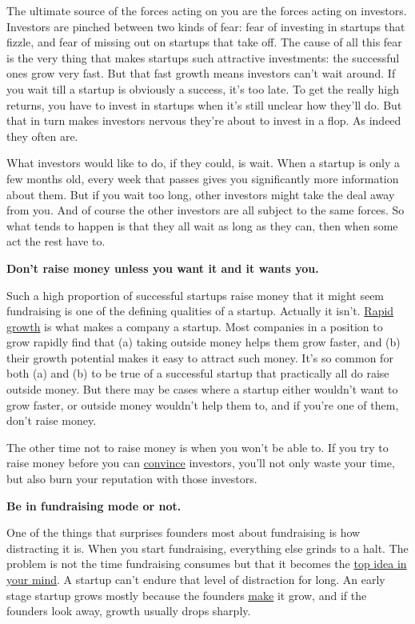 The ultimate source of the forces acting on you are the forces acting on
investors. Investors are pinched between two kinds of fear: fear of
investing in startups that fizzle, and fear of missing out on startups
that take off. The cause of all this fear is the very thing that makes
startups such attractive investments: the successful ones grow very
fast. But that fast growth means investors can't wait around. If you
wait till a startup is obviously a success, it's too late. To get the
really high returns, you have to invest in startups when it's still
unclear how they'll do. But that in turn makes investors nervous they're
about to invest in a flop. As indeed they often are.

What investors would like to do, if they could, is wait. When a startup
is only a few months old, every week that passes gives you significantly
more information about them. But if you wait too long, other investors
might take the deal away from you. And of course the other investors are
all subject to the same forces. So what tends to happen is that they all
wait as long as they can, then when some act the rest have to.

\textbf{Don't raise money unless you want it and it wants you.}

Such a high proportion of successful startups raise money that it might
seem fundraising is one of the defining qualities of a startup. Actually
it isn't. \href{growth.html}{Rapid growth} is what makes a company a
startup. Most companies in a position to grow rapidly find that (a)
taking outside money helps them grow faster, and (b) their growth
potential makes it easy to attract such money. It's so common for both
(a) and (b) to be true of a successful startup that practically all do
raise outside money. But there may be cases where a startup either
wouldn't want to grow faster, or outside money wouldn't help them to,
and if you're one of them, don't raise money.

The other time not to raise money is when you won't be able to. If you
try to raise money before you can \href{convince.html}{convince}
investors, you'll not only waste your time, but also burn your
reputation with those investors.

\textbf{Be in fundraising mode or not.}

One of the things that surprises founders most about fundraising is how
distracting it is. When you start fundraising, everything else grinds to
a halt. The problem is not the time fundraising consumes but that it
becomes the \href{top.html}{top idea in your mind}. A startup can't
endure that level of distraction for long. An early stage startup grows
mostly because the founders \href{ds.html}{make} it grow, and if the
founders look away, growth usually drops sharply.

